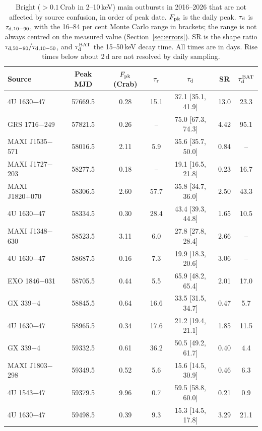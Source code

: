\documentclass[fleqn,usenatbib]{mnras}
\newcommand{\taud}{\tau_{\rm d}}
\newcommand{\taur}{\tau_{\rm r}}
\begin{document}
\begin{table}
\centering
\caption{Bright ($>0.1$\,Crab in 2--10\,keV) main outbursts in 2016--2026 that are not affected by source confusion, in order of peak date. $F_{\rm pk}$ is the daily peak. $\taud$ is $\tau_{\rm d,10-90}$, with the 16--84 per cent Monte Carlo range in brackets; the range is not always centred on the measured value (Section~\ref{sec:errors}). SR is the shape ratio $\tau_{\rm d,50-90}/\tau_{\rm d,10-50}$, and $\tau_{\rm d}^{\rm BAT}$ the 15--50\,keV decay time. All times are in days. Rise times below about 2\,d are not resolved by daily sampling.}
\label{tab:catalogue}
\begin{tabular}{lcccccc}
\toprule
Source & Peak MJD & $F_{\rm pk}$ (Crab) & $\taur$ & $\taud$ & SR & $\tau_{\rm d}^{\rm BAT}$ \\
\midrule
4U 1630$-$47        & 57669.5 & 0.28 & 15.1  & 37.1 [35.1, 41.9] & 13.0 & 23.3 \\
GRS 1716$-$249      & 57821.5 & 0.26 & --    & 75.0 [67.3, 74.3] & 4.42 & 95.1 \\
MAXI J1535$-$571    & 58016.5 & 2.11 & 5.9   & 35.6 [35.7, 50.0] & 0.84 & -- \\
MAXI J1727$-$203    & 58277.5 & 0.18 & --    & 19.1 [16.5, 21.8] & 0.23 & 16.7 \\
MAXI J1820+070      & 58306.5 & 2.60 & 57.7  & 35.8 [34.7, 36.0] & 2.50 & 43.3 \\
4U 1630$-$47        & 58334.5 & 0.30 & 28.4  & 43.4 [39.3, 44.8] & 1.65 & 10.5 \\
MAXI J1348$-$630    & 58523.5 & 3.11 & 6.0   & 27.8 [27.8, 28.4] & 2.66 & -- \\
4U 1630$-$47        & 58687.5 & 0.16 & 7.3   & 19.9 [18.3, 20.6] & 3.06 & -- \\
EXO 1846$-$031      & 58705.5 & 0.44 & 5.5   & 65.9 [48.2, 65.4] & 2.01 & 17.0 \\
GX 339$-$4          & 58845.5 & 0.64 & 16.6  & 33.5 [31.5, 34.7] & 0.47 & 5.7 \\
4U 1630$-$47        & 58965.5 & 0.34 & 17.6  & 21.2 [19.4, 21.1] & 1.85 & 11.5 \\
GX 339$-$4          & 59332.5 & 0.61 & 36.2  & 50.5 [49.2, 61.7] & 0.40 & 4.4 \\
MAXI J1803$-$298    & 59349.5 & 0.52 & 5.6   & 15.6 [14.5, 30.9] & 0.46 & 6.3 \\
4U 1543$-$47        & 59379.5 & 9.96 & 0.7   & 59.5 [58.8, 60.0] & 0.21 & 0.9 \\
4U 1630$-$47        & 59498.5 & 0.39 & 9.3   & 15.3 [14.5, 17.8] & 3.29 & 21.1 \\

\end{tabular}
\end{table}
\end{document}
